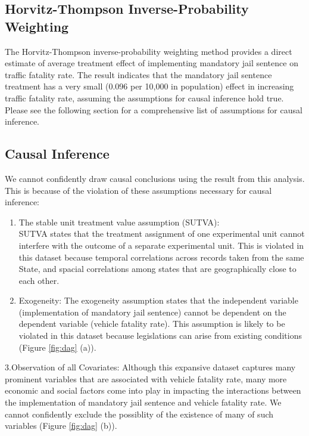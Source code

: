 \documentclass[]{article}
\begin{document}
\hypertarget{horvitz-thompson-inverse-probability-weighting-2}{%
\subsection{Horvitz-Thompson Inverse-Probability Weighting}\label{horvitz-thompson-inverse-probability-weighting-2}}

The Horvitz-Thompson inverse-probability weighting method provides a direct estimate of average treatment effect of implementing mandatory jail sentence on traffic fatality rate. The result indicates that the mandatory jail sentence treatment has a very small (0.096 per 10,000 in population) effect in increasing traffic fatality rate, assuming the assumptions for causal inference hold true. Please see the following section for a comprehensive list of assumptions for causal inference.

\hypertarget{causal-inference}{%
\subsection{Causal Inference}\label{causal-inference}}

We cannot confidently draw causal conclusions using the result from this analysis. This is because of the violation of these assumptions necessary for causal inference:

\begin{enumerate}
\def\labelenumi{\arabic{enumi}.}
\item
  The stable unit treatment value assumption (SUTVA):\\
  SUTVA states that the treatment assignment of one experimental unit cannot interfere with the outcome of a separate experimental unit. This is violated in this dataset because temporal correlations across records taken from the same State, and spacial correlations among states that are geographically close to each other.
\item
  Exogeneity: The exogeneity assumption states that the independent variable (implementation of mandatory jail sentence) cannot be dependent on the dependent variable (vehicle fatality rate). This assumption is likely to be violated in this dataset because legislations can arise from existing conditions (Figure \ref{fig:dag} (a)).
\end{enumerate}

3.Observation of all Covariates: Although this expansive dataset captures many prominent variables that are associated with vehicle fatality rate, many more economic and social factors come into play in impacting the interactions between the implementation of mandatory jail sentence and vehicle fatality rate. We cannot confidently exclude the possiblity of the existence of many of such variables (Figure \ref{fig:dag} (b)).
\end{document}
